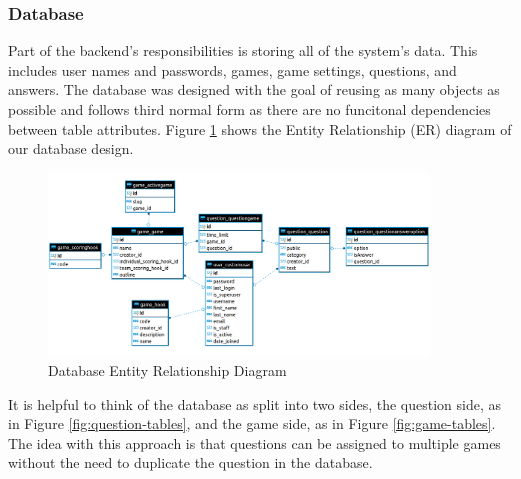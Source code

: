 \documentclass{article}
\begin{document}
		\subsubsection{Database}\label{database}
    		Part of the backend's responsibilities is storing all of the system's data. This includes user names and passwords, games, game settings, questions, and answers. The database was designed with the goal of reusing as many objects as possible and follows third normal form as there are no funcitonal dependencies between table attributes. Figure \ref{fig:database-er_diagram} shows the Entity Relationship (ER) diagram of our database design.
    		
            \begin{figure}[ht]
                \centering
                \includegraphics[width=0.9\textwidth]{images/database-er_diagram.png}
                \caption{Database Entity Relationship Diagram}
                \label{fig:database-er_diagram}
            \end{figure}
            
            It is helpful to think of the database as split into two sides, the question side, as in Figure \ref{fig:question-tables}, and the game side, as in Figure \ref{fig:game-tables}. The idea with this approach is that questions can be assigned to multiple games without the need to duplicate the question in the database.
            
\end{document}
